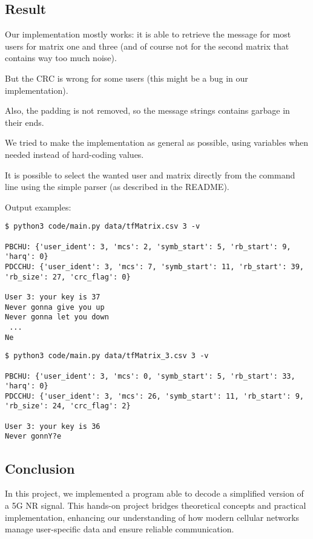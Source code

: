 \documentclass[a4paper, 12pt, twoside]{article}
\begin{document}
    \begin{indt}{\section{Result}} %
        Our implementation mostly works: it is able to retrieve the message for most users for matrix one and three (and of course not for the second matrix that contains way too much noise).

        But the CRC is wrong for some users (this might be a bug in our implementation).

        Also, the padding is not removed, so the message strings contains garbage in their ends.

        \vspace{12pt}
        
        We tried to make the implementation as general as possible, using variables when needed instead of hard-coding values.

        It is possible to select the wanted user and matrix directly from the command line using the simple parser (as described in the README).

        \vspace{12pt}
        
        Output examples:
        \begin{lstlisting}[xleftmargin=40pt]
$ python3 code/main.py data/tfMatrix.csv 3 -v

PBCHU: {'user_ident': 3, 'mcs': 2, 'symb_start': 5, 'rb_start': 9, 'harq': 0}
PDCCHU: {'user_ident': 3, 'mcs': 7, 'symb_start': 11, 'rb_start': 39, 'rb_size': 27, 'crc_flag': 0}

User 3: your key is 37
Never gonna give you up
Never gonna let you down
 ...
Ne \end{lstlisting}%


        \begin{lstlisting}[xleftmargin=40pt]
$ python3 code/main.py data/tfMatrix_3.csv 3 -v

PBCHU: {'user_ident': 3, 'mcs': 0, 'symb_start': 5, 'rb_start': 33, 'harq': 0}
PDCCHU: {'user_ident': 3, 'mcs': 26, 'symb_start': 11, 'rb_start': 9, 'rb_size': 24, 'crc_flag': 2}

User 3: your key is 36
Never gonnY?e \end{lstlisting}%
    \end{indt} %

    \begin{indt}{\section{Conclusion}}%
        In this project, we implemented a program able to decode a simplified version of a 5G NR signal.
        This hands-on project bridges theoretical concepts and practical implementation, enhancing our understanding of how modern cellular networks manage user-specific data and ensure reliable communication.
    \end{indt}%
    
\end{document}
